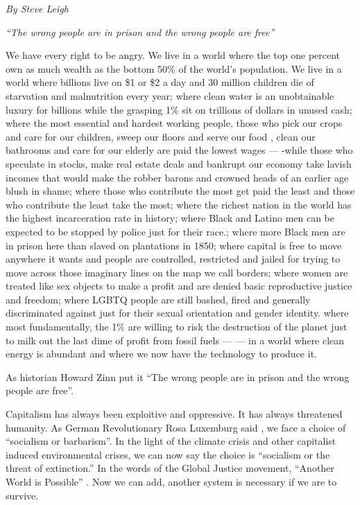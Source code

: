 \emph{By Steve Leigh}

\emph{“The wrong people are in prison and the wrong people are free”}

We have every right to be angry. We live in a world where the top one percent own as much wealth as the bottom 50\% of the world’s population. We live in a world where billions live on \$1 or \$2 a day and 30 million children die of starvation and malnutrition every year; where clean water is an unobtainable luxury for billions while the grasping 1\% sit on trillions of dollars in unused cash; where the most essential and hardest working people, those who pick our crops and care for our children, sweep our floors and serve our food , clean our bathrooms and care for our elderly are paid the lowest wages — -while those who speculate in stocks, make real estate deals and bankrupt our economy take lavish incomes that would make the robber barons and crowned heads of an earlier age blush in shame; where those who contribute the most get paid the least and those who contribute the least take the most; where the richest nation in the world has the highest incarceration rate in history; where Black and Latino men can be expected to be stopped by police just for their race.; where more Black men are in prison here than slaved on plantations in 1850; where capital is free to move anywhere it wants and people are controlled, restricted and jailed for trying to move across those imaginary lines on the map we call borders; where women are treated like sex objects to make a profit and are denied basic reproductive justice and freedom; where LGBTQ people are still bashed, fired and generally discriminated against just for their sexual orientation and gender identity. where most fundamentally, the 1\% are willing to risk the destruction of the planet just to milk out the last dime of profit from fossil fuels — — in a world where clean energy is abundant and where we now have the technology to produce it.

As historian Howard Zinn put it “The wrong people are in prison and the wrong people are free”.

Capitalism has always been exploitive and oppressive. It has always threatened humanity. As German Revolutionary Rosa Luxemburg said , we face a choice of “socialism or barbarism”. In the light of the climate crisis and other capitalist induced environmental crises, we can now say the choice is “socialism or the threat of extinction.” In the words of the Global Justice movement, “Another World is Possible” . Now we can add, another system is necessary if we are to survive.

